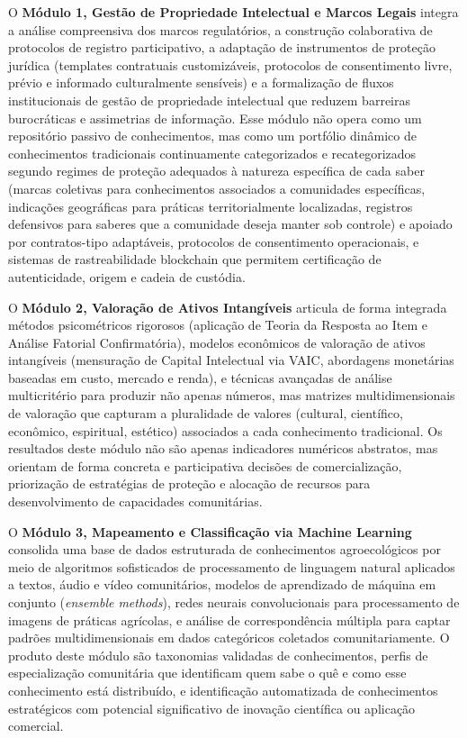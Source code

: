 O \textbf{Módulo 1, Gestão de Propriedade Intelectual e Marcos Legais} integra a análise compreensiva dos marcos regulatórios, a construção colaborativa de protocolos de registro participativo, a adaptação de instrumentos de proteção jurídica (templates contratuais customizáveis, protocolos de consentimento livre, prévio e informado culturalmente sensíveis) e a formalização de fluxos institucionais de gestão de propriedade intelectual que reduzem barreiras burocráticas e assimetrias de informação. Esse módulo não opera como um repositório passivo de conhecimentos, mas como um portfólio dinâmico de conhecimentos tradicionais continuamente categorizados e recategorizados segundo regimes de proteção adequados à natureza específica de cada saber (marcas coletivas para conhecimentos associados a comunidades específicas, indicações geográficas para práticas territorialmente localizadas, registros defensivos para saberes que a comunidade deseja manter sob controle) e apoiado por contratos-tipo adaptáveis, protocolos de consentimento operacionais, e sistemas de rastreabilidade blockchain que permitem certificação de autenticidade, origem e cadeia de custódia.

O \textbf{Módulo 2, Valoração de Ativos Intangíveis} articula de forma integrada métodos psicométricos rigorosos (aplicação de Teoria da Resposta ao Item e Análise Fatorial Confirmatória), modelos econômicos de valoração de ativos intangíveis (mensuração de Capital Intelectual via VAIC, abordagens monetárias baseadas em custo, mercado e renda), e técnicas avançadas de análise multicritério para produzir não apenas números, mas matrizes multidimensionais de valoração que capturam a pluralidade de valores (cultural, científico, econômico, espiritual, estético) associados a cada conhecimento tradicional. Os resultados deste módulo não são apenas indicadores numéricos abstratos, mas orientam de forma concreta e participativa decisões de comercialização, priorização de estratégias de proteção e alocação de recursos para desenvolvimento de capacidades comunitárias.

O \textbf{Módulo 3, Mapeamento e Classificação via Machine Learning} consolida uma base de dados estruturada de conhecimentos agroecológicos por meio de algoritmos sofisticados de processamento de linguagem natural aplicados a textos, áudio e vídeo comunitários, modelos de aprendizado de máquina em conjunto (\textit{ensemble methods}), redes neurais convolucionais para processamento de imagens de práticas agrícolas, e análise de correspondência múltipla para captar padrões multidimensionais em dados categóricos coletados comunitariamente. O produto deste módulo são taxonomias validadas de conhecimentos, perfis de especialização comunitária que identificam quem sabe o quê e como esse conhecimento está distribuído, e identificação automatizada de conhecimentos estratégicos com potencial significativo de inovação científica ou aplicação comercial.

